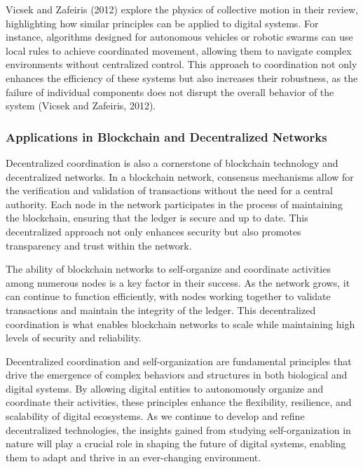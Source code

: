 \documentclass[12pt,twoside]{article}
\begin{document}
Vicsek and Zafeiris (2012) explore the physics of collective motion in their review, highlighting how similar principles can be applied to digital systems. For instance, algorithms designed for autonomous vehicles or robotic swarms can use local rules to achieve coordinated movement, allowing them to navigate complex environments without centralized control. This approach to coordination not only enhances the efficiency of these systems but also increases their robustness, as the failure of individual components does not disrupt the overall behavior of the system (Vicsek and Zafeiris, 2012).


\subsubsection{Applications in Blockchain and Decentralized Networks}

Decentralized coordination is also a cornerstone of blockchain technology and decentralized networks. In a blockchain network, consensus mechanisms allow for the verification and validation of transactions without the need for a central authority. Each node in the network participates in the process of maintaining the blockchain, ensuring that the ledger is secure and up to date. This decentralized approach not only enhances security but also promotes transparency and trust within the network.

The ability of blockchain networks to self-organize and coordinate activities among numerous nodes is a key factor in their success. As the network grows, it can continue to function efficiently, with nodes working together to validate transactions and maintain the integrity of the ledger. This decentralized coordination is what enables blockchain networks to scale while maintaining high levels of security and reliability.

Decentralized coordination and self-organization are fundamental principles that drive the emergence of complex behaviors and structures in both biological and digital systems. By allowing digital entities to autonomously organize and coordinate their activities, these principles enhance the flexibility, resilience, and scalability of digital ecosystems. As we continue to develop and refine decentralized technologies, the insights gained from studying self-organization in nature will play a crucial role in shaping the future of digital systems, enabling them to adapt and thrive in an ever-changing environment.
\end{document}
